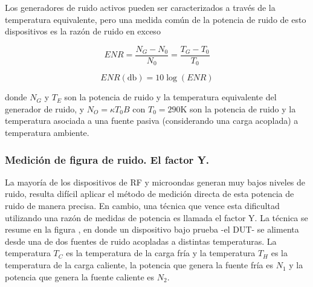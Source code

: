\documentclass{article}
\begin{document}
	Los generadores de ruido activos pueden ser caracterizados a través de la temperatura equivalente, pero  una medida común de la potencia de ruido de esto dispositivos es la razón de ruido en exceso
	
	\begin{equation}
		ENR = \frac{N_G-N_0}{N_0} = \frac{T_G - T_0}{T_0}
	\end{equation}
	
	\begin{equation}
		ENR(\si{\decibel}) = 10\log(ENR)
	\end{equation}	
	
	\noindent donde $N_G$ y $T_E$ son la potencia de ruido y la temperatura equivalente del generador de ruido, y $N_O = {\kappa}T_0B$ con $T_0 = 290\si{\kelvin}$ son la potencia de ruido y la temperatura asociada a una fuente pasiva (considerando una carga acoplada) a temperatura ambiente.
	
	\subsubsection{Medición de figura de ruido. El factor Y.}	
	
	La mayoría de los dispositivos de RF y microondas generan muy bajos niveles de ruido, resulta difícil aplicar el método de medición directa de esta potencia de ruido de manera precisa. En cambio, una técnica que vence esta dificultad utilizando una razón de medidas de potencia  es llamada el factor Y.  La técnica se resume en la figura , en donde un dispositivo bajo prueba -el DUT- se alimenta desde una de dos fuentes de ruido acopladas a distintas temperaturas. La temperatura $T_C$ es la temperatura de la carga fría y la temperatura $T_H$ es la temperatura de la carga caliente, la potencia que genera la fuente fría es $N_1$  y la potencia que genera la fuente caliente es $N_2$.  
	
	\begin{center}				
	\end{center}	
	
\end{document}
